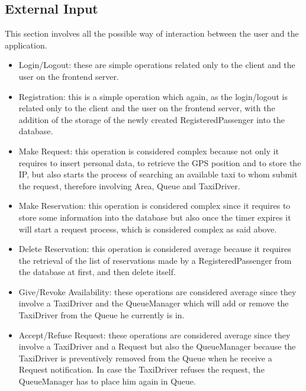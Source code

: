 \subsection{External Input}
This section involves all the possible way of interaction between the user and
the application.
\begin{itemize}
  \item Login/Logout: these are simple operations related only to the client and
  the user on the frontend server.
  \item Registration: this is a simple operation which again, as the login/logout is
  related only to the client and the user on the frontend server, with the addition of the
  storage of the newly created RegisteredPassenger into the database.
  \item Make Request: this operation is considered complex because not only it requires
  to insert personal data, to retrieve the GPS position and to store the IP, but also starts
  the process of searching an available taxi to whom submit the request, therefore involving Area,
  Queue and TaxiDriver.
  \item Make Reservation: this operation is considered complex since it requires to store some information
  into the database but also once the timer expires it will start a request process, which is considered
  complex as said above.
  \item Delete Reservation: this operation is considered average because it requires the retrieval of
  the list of reservations made by a RegisteredPassenger from the database at first, and then delete itself.
  \item Give/Revoke Availability: these operations are considered average since they involve a TaxiDriver and the
  QueueManager which will add or remove the TaxiDriver from the Queue he currently is in.
  \item Accept/Refuse Request: these operations are considered average since they involve a TaxiDriver and a Request
  but also the QueueManager because the TaxiDriver is preventively removed from the Queue when he receive a Request notification.
  In case the TaxiDriver refuses the request, the QueueManager has to place him again in Queue.
\end{itemize}
